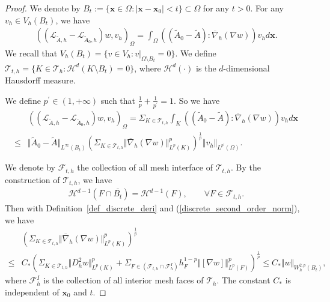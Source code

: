 \documentclass[12pt]{amsart}
\newcommand{\boldx}{\boldsymbol{x}}
\theoremstyle{definition}
\theoremstyle{remark}
\begin{document}
\begin{proof}
We denote by $B_{t}:= \{ \boldx \in \Omega: \vert \boldx - \boldx_{0} \vert < t \} \subset \Omega$ 
for any $t>0$. For any $v_{h} \in V_{h}(B_{t})$, we have 
\begin{align*}
((\mathcal{L}_{\tilde{A},h} - \mathcal{L}_{\tilde{A}_{0},h})w, v_{h})_{\Omega} 
= \int_{\Omega}\left((\tilde{A}_{0} - \tilde{A}):\overline{\nabla}_{h}(\nabla w)\right)v_{h} d\boldx.
\end{align*}
We recall that $V_{h}(B_{t})=\{ v \in V_{h}: v|_{\Omega \setminus B_{t}} = 0\}$. 
We define $\mathcal{T}_{t,h} = \{ K \in \mathcal{T}_{h}: \mathcal{H}^{d}(K \setminus B_{t}) = 0 \}$, 
where $\mathcal{H}^{d}(\cdot)$ is the $d$-dimensional Hausdorff measure.

We define $p^{\prime}\in (1, + \infty)$ such that $\frac{1}{p} + \frac{1}{p^{\prime}} = 1$.  So we have 
\begin{align*}
& ((\mathcal{L}_{\tilde{A},h} - \mathcal{L}_{\tilde{A}_{0},h})w, v_{h})_{\Omega} 
= \Sigma_{K \in \mathcal{T}_{t,h}}\int_{K}\left((\tilde{A}_{0} - \tilde{A}):\overline{\nabla}_{h}(\nabla w)\right)
v_{h} d\boldx \\
\leq & \Vert \tilde{A}_{0} - \tilde{A} \Vert_{L^{\infty}(B_{t})} 
\left( \Sigma_{K \in \mathcal{T}_{t,h}} \Vert \overline{\nabla}_{h}(\nabla w)\Vert_{L^{p}(K)}^{p} \right)^{\frac{1}{p}} 
\Vert v_{h}\Vert_{L^{p^{\prime}}(\Omega)}.
\end{align*}


We denote by $\mathcal{F}_{t,h}$ the collection of all mesh interface of $\mathcal{T}_{t,h}$.  
By the construction of $\mathcal{T}_{t,h}$, we have  
\begin{align*}
\mathcal{H}^{d-1}(F \cap \overline{B_{t}}) = \mathcal{H}^{d-1}(F), 
\qquad \forall F \in \mathcal{F}_{t,h}.
\end{align*}
Then with Definition~\ref{def_discrete_deri} and (\ref{discrete_second_order_norm}), we have 
\begin{align*}
& \left(\Sigma_{K \in \mathcal{T}_{t,h}} \Vert \overline{\nabla}_{h}(\nabla w)\Vert_{L^{p}(K)}^{p}\right)^{\frac{1}{p}} \\ 
\leq & C_{*} \left(\Sigma_{K \in \mathcal{T}_{t,h}} \Vert D_{h}^{2} w\Vert_{L^{p}(K)}^{p}
+ \Sigma_{F \in (\mathcal{F}_{t,h} \cap \mathcal{F}_{h}^{I}) }h_{F}^{1-p}\Vert [\nabla w]\Vert_{L^{p}(F)}^{p} 
\right)^{\frac{1}{p}} 
\leq C_{*} \Vert w\Vert_{W_{h}^{2,p}(B_{t})},
\end{align*} 
where $\mathcal{F}_{h}^{I}$ is the collection of all interior mesh faces of $\mathcal{T}_{h}$.
The constant $C_{*}$ is independent of $\boldx_{0}$ and $t$. 


\end{proof}
\end{document}
